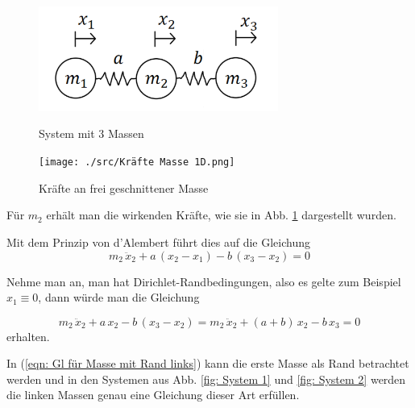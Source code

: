 \documentclass[a4paper,12pt]{report}
\newcommand{\1}{\mathds{1}}
\theoremstyle{plain} %
\theoremstyle{definition} %
\theoremstyle{remark}
\begin{document}
            \begin{figure}[ht]
                  \centering
                  \begin{minipage}[ht]{0.49\linewidth}
                        \centering
                        \includegraphics[width=0.7\textwidth, keepaspectratio]{./src/3 Massen System.png}
                        \caption{System mit 3 Massen}
                        \label{fig: 3 Massen System}
                  \end{minipage}
                  \hfill
                  \begin{minipage}[ht]{0.49\linewidth}
                        \centering
                        \texttt{[image: ./src/Kräfte Masse 1D.png]}
                        \caption{Kräfte an frei geschnittener Masse}
                        \label{fig: Kräfte Masse 1D}
                  \end{minipage}
            \end{figure}

            Für $m_2$ erhält man die wirkenden Kräfte, wie sie in Abb. \ref{fig: Kräfte Masse 1D} dargestellt wurden.

            Mit dem Prinzip von d'Alembert führt dies auf die Gleichung
            \begin{equation}
                  \label{eqn: Gl für Masse}
                  m_2\,\ddot x_2 + a\,(x_2-x_1) - b\,(x_3-x_2) = 0
            \end{equation}

            Nehme man an, man hat Dirichlet-Randbedingungen, also es gelte zum Beispiel $x_1 \equiv 0$, dann würde man die Gleichung

            \begin{equation}
                  \label{eqn: Gl für Masse mit Rand links}
                  m_2\,\ddot x_2 + a\,x_2 - b\,(x_3-x_2) = m_2\,\ddot x_2 + (a+b)\,x_2 -b\,x_3 = 0
            \end{equation}
            erhalten.

            In (\ref{eqn: Gl für Masse mit Rand links}) kann die erste Masse als Rand betrachtet werden und in den Systemen aus Abb. \ref{fig: System 1} und \ref{fig: System 2} werden die linken Massen genau eine Gleichung dieser Art erfüllen.
\end{document}
